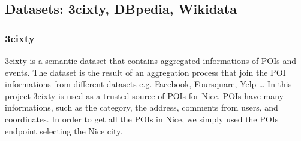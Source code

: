 \documentclass[paper=a4, fontsize=11pt]{scrartcl}
\begin{document}
\subsection{Datasets: 3cixty, DBpedia, Wikidata}
\subsubsection{3cixty}
3cixty is a semantic dataset that contains aggregated informations of POIs and events. The dataset is the result of an aggregation process that join the POI informations from different datasets e.g. Facebook, Foursquare, Yelp \dots
In this project 3cixty is used as a trusted source of POIs for Nice.
POIs have many informations, such as the category, the address, comments from users, and coordinates. In order to get all the POIs in Nice, we simply used the POIs endpoint selecting the Nice city.
\end{document}
